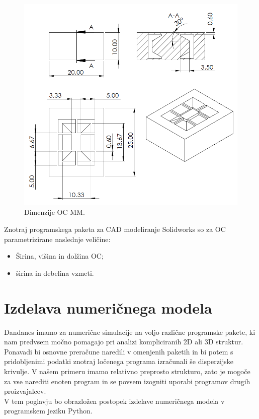 \documentclass[12pt]{report}
\begin{document}
\begin{figure}[H]
  \centering
  \includegraphics[scale=0.8]{Images/drawing.png}
  \caption{Dimenzije \ac{OC} \ac{MM}.}
\end{figure}
Znotraj programskega paketa za CAD modeliranje Solidworks so za \ac{OC} parametrizirane naslednje veličine:
\begin{itemize}
  \item Širina, višina in dolžina \ac{OC};
  \item širina in debelina vzmeti.
\end{itemize}

\section{Izdelava numeričnega modela}
Dandanes imamo za numerične simulacije na voljo različne programske pakete, ki nam predvsem močno pomagajo pri analizi kompliciranih 2D ali 3D struktur. Ponavadi bi osnovne preračune naredili
v omenjenih paketih in bi potem s pridobljenimi podatki znotraj ločenega programa izračunali še disperzijske krivulje.
V našem primeru imamo relativno preprosto strukturo, zato je mogoče za vse narediti enoten program in se povsem izogniti uporabi programov drugih proizvajalcev.
\\
V tem poglavju bo obrazložen postopek izdelave numeričnega modela v programskem jeziku Python.
\end{document}
